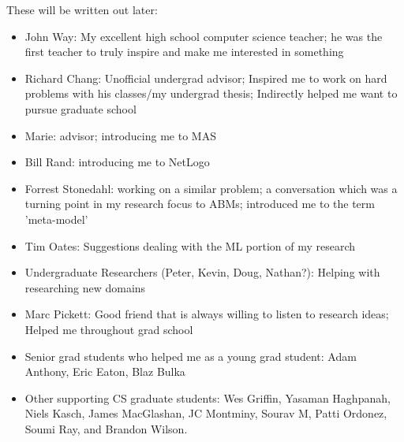 \pagestyle{plain}

These will be written out later:
\begin{itemize}
  \item John Way: My excellent high school computer science teacher; he was the first teacher to truly inspire and make me interested in something
  \item Richard Chang: Unofficial undergrad advisor; Inspired me to work on hard problems with his classes/my undergrad thesis; Indirectly helped me want to pursue graduate school
  \item Marie: advisor; introducing me to MAS
  \item Bill Rand: introducing me to NetLogo
  \item Forrest Stonedahl: working on a similar problem; a conversation which was a turning point in my research focus to ABMs; introduced me to the term 'meta-model'
  \item Tim Oates: Suggestions dealing with the ML portion of my research
  \item Undergraduate Researchers (Peter, Kevin, Doug, Nathan?): Helping with researching new domains
  \item Marc Pickett: Good friend that is always willing to listen to research ideas; Helped me throughout grad school
  \item Senior grad students who helped me as a young grad student: Adam Anthony, Eric Eaton, Blaz Bulka
  \item Other supporting CS graduate students: Wes Griffin, Yasaman Haghpanah, Niels Kasch, James MacGlashan, JC Montminy, Sourav M, Patti Ordonez, Soumi Ray, and Brandon Wilson.
\end{itemize}
